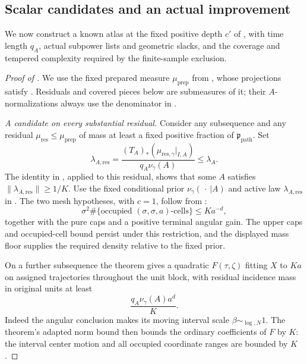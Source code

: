 \subsection{Scalar candidates and an actual improvement}

We now construct a known atlas at the fixed positive depth
\(c'\) of , with time length \(q_A\), actual
subpower lists and geometric slacks, and the coverage and tempered
complexity required by the finite-sample exclusion.

\begin{proof}[Proof of ]
We use the fixed prepared measure \(\mu_{\mathrm{prep}}\) from
, whose projections satisfy
.  Residuals and covered pieces
below are submeasures of it; their \(A\)-normalizations always use
the denominator in .

\emph{A candidate on every substantial residual.}
Consider any subsequence and any residual
\(\mu_{\mathrm{res}}\le\mu_{\mathrm{prep}}\) of mass at least a
fixed positive fraction of \(\mathfrak p_{\mathrm{path}}\).
Set
\[
 \lambda_{A,\mathrm{res}}
   =\frac{(T_A)_*(\mu_{\mathrm{res},\gamma}|_{I,A})}
          {q_A\nu_\gamma(A)}\le\lambda_A.
\]
The identity in , applied to this
residual, shows that some \(A\) satisfies
\(\|\lambda_{A,\mathrm{res}}\|\ge1/K\).
Use the fixed conditional prior \(\nu_\gamma(\,\cdot\,|A)\) and
active law \(\lambda_{A,\mathrm{res}}\) in
.  The two mesh hypotheses, with
\(c=1\), follow from :
\[
 \sigma^2
 \#\{\text{occupied }(\sigma,\sigma,a)\text{-cells}\}
       \le Ka^{-d},
\]
together with the pure caps and a positive terminal angular gain.
The upper caps and occupied-cell bound persist under this
restriction, and the displayed mass floor supplies the required
density relative to the fixed prior.

On a further subsequence the theorem gives a quadratic
\(F(\tau,\zeta)\) fitting \(X\) to \(Ka\) on assigned trajectories
throughout the unit block, with residual incidence mass in original
units at least
\begin{equation}
 \label{a08:candidate-floor}
 \frac{q_A\nu_\gamma(A)a^d}{K}.
\end{equation}
Indeed the angular conclusion makes its moving interval scale
\(\beta\sim_{\log,N}1\).  The theorem's adapted norm bound then
bounds the ordinary coefficients of \(F\) by \(K\): the interval
center motion and all occupied coordinate ranges are bounded by
\(K\).


\end{proof}
